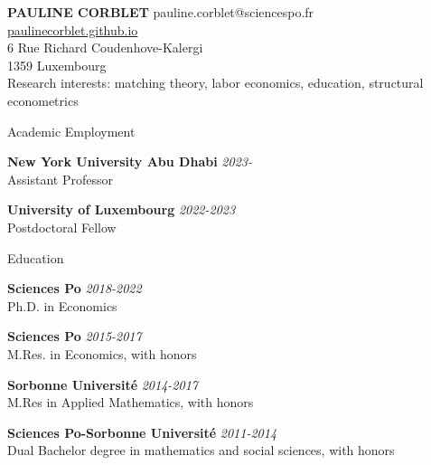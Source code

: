 \documentclass{resume} %
\begin{document}
{\bf \large PAULINE CORBLET} \hfill pauline.corblet@sciencespo.fr\\
{\phantom{smth}} \hfill \href{https://paulinecorblet.github.io}{paulinecorblet.github.io} \\
6 Rue Richard Coudenhove-Kalergi \\ 
1359 Luxembourg \\

{\large Research interests: matching theory, labor economics, education, structural econometrics}


\begin{rSection}{Academic Employment}

{\bf New York University Abu Dhabi} \hfill {\em 2023-} \\
  Assistant Professor

{\bf University of Luxembourg} \hfill {\em 2022-2023} \\
Postdoctoral Fellow

\end{rSection}

\begin{rSection}{Education}

{\bf Sciences Po} \hfill {\em 2018-2022}
\\ Ph.D. in Economics

{\bf Sciences Po} \hfill {\em 2015-2017}
\\ M.Res. in Economics, with honors

{\bf Sorbonne Université} \hfill {\em 2014-2017}
\\ M.Res in Applied Mathematics, with honors

{\bf Sciences Po-Sorbonne Université} \hfill {\em 2011-2014}
\\ Dual Bachelor degree in mathematics and social sciences, with honors


\end{rSection}
%
%
%
\end{document}
